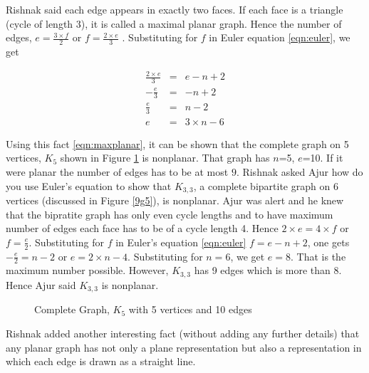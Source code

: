 Rishnak said each edge appears in exactly two faces. If each face is a triangle (cycle of length 3), it is called a maximal planar graph. Hence the number of edges, $e=\frac{3 \times f}{2}$ or $f=\frac{2 \times e}{3}$ . Substituting for $f$ in Euler equation \ref{eqn:euler}, we get

\begin{eqnarray}
  \label{eqn:maxplanar}  
    \frac{2\times e}{3}&=&e-n+2\nonumber\\
    -\frac{e}{3} &=&-n+2\nonumber \\
    \frac{e}{3}&=&n-2 \nonumber \\
    e&=& 3 \times n - 6
\end{eqnarray}

Using this fact \ref{eqn:maxplanar}, it can be shown that the complete graph on 5 vertices, $K_5$ shown in Figure \ref{9g10} is nonplanar. That graph has $n$=5, $e$=10. If it were planar the number of edges has to be at most $9$. 
Rishnak asked Ajur how do you use Euler's equation to show that $K_{3,3}$, a complete bipartite graph on 6 vertices (discussed in Figure \ref{9g5}), is nonplanar. 
Ajur was alert and he knew that the bipratite graph has only even cycle lengths and to have maximum number of edges each face has to be of a cycle length 4. Hence $2\times e =4 \times f$ or $f=\frac{e}{2}$. Substituting for $f$ in Euler's equation \ref{eqn:euler}
$f=e-n+2$, one gets $-\frac{e}{2}=n-2$ or $e=2\times n -4$. Substituting for $n=6$, we get $e=8$. That is the maximum number possible. However, $K_{3,3}$ has 9 edges which is more than 8. Hence Ajur said $K_{3,3}$ is nonplanar.
\begin{figure}
\begin{center}
\caption{ Complete Graph, $K_5$ with 5 vertices and 10 edges }\label{9g10}
\end{center}
\end{figure}
Rishnak added another interesting fact (without adding any further details) that any planar graph has not only a plane representation but also a representation in which each edge is drawn as a straight line.

